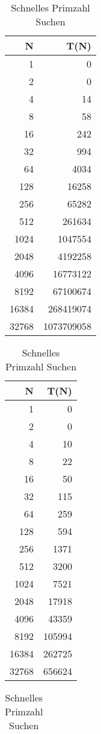 \documentclass[paper=a4, fontsize=11pt]{scrartcl} %
\numberwithin{equation}{section} %
\numberwithin{figure}{section} %
\numberwithin{table}{section} %
\begin{document}
\begin{table}[h]
  \parbox{.5\linewidth}{
  \centering
  \begin{tabular}{ r | r }
    N & T(N) \\
    \hline
    1 & 0 \\
    2 & 0 \\
    4 & 14 \\
    8 & 58 \\
    16 & 242 \\
    32 & 994 \\
    64 & 4034 \\
    128 & 16258 \\
    256 & 65282 \\
    512 & 261634 \\
    1024 & 1047554 \\
    2048 & 4192258 \\
    4096 & 16773122 \\
    8192 & 67100674 \\
    16384 & 268419074 \\
    32768 & 1073709058 \\
  \end{tabular}
  \caption{Langsames Primzahl Suchen}
  \label{table:1}
  }
  \parbox{.5\linewidth}{
  \centering
  \begin{tabular}{ r | r }
    N & T(N) \\
    \hline
    1 & 0 \\
    2 & 0 \\
    4 & 10 \\
    8 & 22 \\
    16 & 50 \\
    32 & 115 \\
    64 & 259 \\
    128 & 594 \\
    256 & 1371 \\
    512 & 3200 \\
    1024 & 7521 \\
    2048 & 17918 \\
    4096 & 43359 \\
    8192 & 105994 \\
    16384 & 262725 \\
    32768 & 656624 \\
  \end{tabular}
  \caption{Schnelles Primzahl Suchen}
  \label{table:2}
  }
  \parbox{.5\linewidth}{
    \centering
    \begin{tabular}{ r | r }

\end{tabular}}
\end{table}
\end{document}
